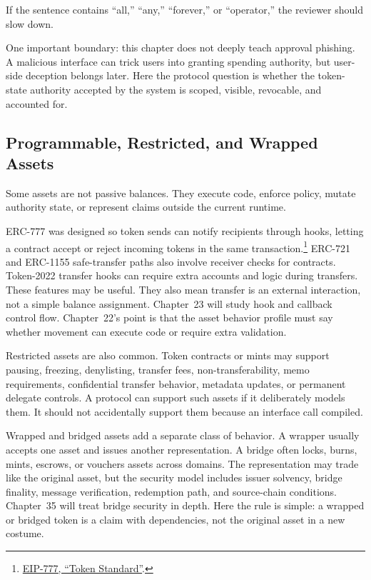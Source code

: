 If the sentence contains ``all,'' ``any,'' ``forever,'' or ``operator,'' the reviewer should slow down.

One important boundary: this chapter does not deeply teach approval phishing. A malicious interface can trick users into granting spending authority, but user-side deception belongs later. Here the protocol question is whether the token-state authority accepted by the system is scoped, visible, revocable, and accounted for.

\subsection{Programmable, Restricted, and Wrapped Assets}

Some assets are not passive balances. They execute code, enforce policy, mutate authority state, or represent claims outside the current runtime.

ERC-777 was designed so token sends can notify recipients through hooks, letting a contract accept or reject incoming tokens in the same transaction.\footnote{\href{https://eips.ethereum.org/EIPS/eip-777}{EIP-777, ``Token Standard''}.} ERC-721 and ERC-1155 safe-transfer paths also involve receiver checks for contracts. Token-2022 transfer hooks can require extra accounts and logic during transfers. These features may be useful. They also mean transfer is an external interaction, not a simple balance assignment. Chapter~23 will study hook and callback control flow. Chapter~22's point is that the asset behavior profile must say whether movement can execute code or require extra validation.

Restricted assets are also common. Token contracts or mints may support pausing, freezing, denylisting, transfer fees, non-transferability, memo requirements, confidential transfer behavior, metadata updates, or permanent delegate controls. A protocol can support such assets if it deliberately models them. It should not accidentally support them because an interface call compiled.

Wrapped and bridged assets add a separate class of behavior. A wrapper usually accepts one asset and issues another representation. A bridge often locks, burns, mints, escrows, or vouchers assets across domains. The representation may trade like the original asset, but the security model includes issuer solvency, bridge finality, message verification, redemption path, and source-chain conditions. Chapter~35 will treat bridge security in depth. Here the rule is simple: a wrapped or bridged token is a claim with dependencies, not the original asset in a new costume.

